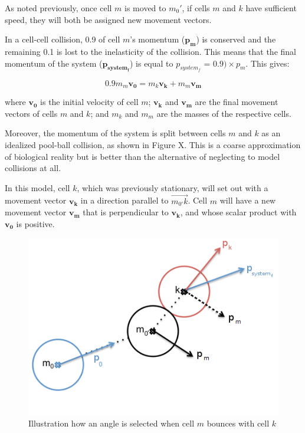 \documentclass[12pt]{article}
\begin{document}
As noted previously, once cell \(m\) is moved to \(m_0'\), if 
cells \(m\) and \(k\) have sufficient speed, they will both be assigned new movement vectors.

In a cell-cell collision, 0.9 of cell \(m\)'s momentum (\(\mathbf{p_m}\)) is conserved and the 
remaining 0.1 is lost to the inelasticity of the collision. This means that the final momentum 
of the system (\(\mathbf{p_{system_f}}\)) is equal to \(p_{system_f}\) = \(0.9) \times p_m\). 
This gives:

\begin{equation}
  0.9m_m\mathbf{v_0} = m_k\mathbf{v_k}+m_m\mathbf{v_m}
\end{equation}

where \(\mathbf{v_0}\) is the initial velocity of cell \(m\);
\(\mathbf{v_k}\) and \(\mathbf{v_m}\) are the final movement vectors of cells \(m\) and \(k\); and \(m_k\) and
\(m_m\) are the masses of the respective cells.

Moreover, the momentum of the system is split between cells \(m\) and \(k\) as an idealized 
pool-ball collision, as shown in Figure X. This is a coarse approximation of biological 
reality but is better than the alternative of neglecting to model collisions at all. 

In this model, cell \(k\), which was previously stationary, will 
set out with a movement vector \(\mathbf{v_k}\) in a direction parallel to \(\overrightarrow{m_{0'}k}\).
Cell \(m\) will have a new movement vector \(\mathbf{v_m}\) 
that is perpendicular to \(\mathbf{v_k}\), and whose scalar product with \(\mathbf{v_0}\) 
is positive.

\begin{figure}[H]
\centering
\includegraphics[width=\textwidth]{media/cellcollide.png}
\caption{Illustration how an angle is selected when cell \(m\) bounces with cell \(k\)}
\end{figure}
\end{document}
